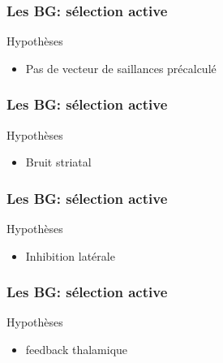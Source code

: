 \documentclass[10pt]{beamer}
\begin{document}
\begin{frame}
  \frametitle{Les BG: s\'election active}
{ {\color {blue} Hypoth\`eses}}
\begin{itemize}
\item Pas de vecteur de saillances pr\'ecalcul\'e 
\end{itemize}
\hspace{2cm}      

\end{frame}

\begin{frame}
  \frametitle{Les BG: s\'election active}
{{\color {blue} Hypoth\`eses}}
\begin{itemize}
\item Bruit striatal
\end{itemize}
\hspace{2cm}      

\end{frame}

\begin{frame}
  \frametitle{Les BG: s\'election active}
{{\color {blue} Hypoth\`eses}}
\begin{itemize}
\item Inhibition lat\'erale
\end{itemize}
\hspace{2cm}      
\end{frame}

\begin{frame}
  \frametitle{Les BG: s\'election active}
{ {\color {blue} Hypoth\`eses}}
\begin{itemize}
\item feedback thalamique
\end{itemize}
\hspace{2cm}     

\end{frame}
\end{document}
